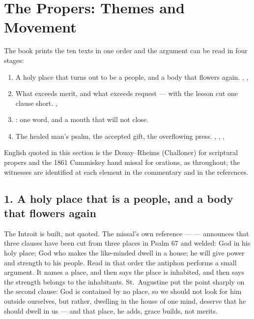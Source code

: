 \sectionguard
\section*{The Propers: Themes and Movement}
\label{triptych:brief-synthesis:start}


The book prints the ten texts in one order and the argument can be read in
four stages:

\begin{enumerate}[leftmargin=1.5em, itemsep=0.1em]
  \item A holy place that turns out to be a people, and a body that flowers again. , , 
  \item What exceeds merit, and what exceeds request --- with the lesson cut one clause short. , 
  \item {}: one word, and a mouth that will not close. 
  \item The healed man's psalm, the accepted gift, the overflowing press. , , , 
\end{enumerate}

English quoted in this section is the Douay--Rheims (Challoner) for scriptural
propers and the 1861 Cummiskey hand missal for orations, as throughout; the
witnesses are identified at each element in the commentary and in the
references.

\subsection*{1. A holy place that is a people, and a body that flowers again}

The Introit is built, not quoted. The missal's own reference ---  --- announces that three clauses have been cut from three places in Psalm
67 and welded: God in his holy place; God who makes the like-minded dwell in a
house; he will give power and strength to his people. Read in that order the
antiphon performs a small argument. It names a place, and then says the place
is inhabited, and then says the strength belongs to the inhabitants. St.\
Augustine put the point sharply on the second clause: God is contained by no
place, so we should not look for him outside ourselves, but rather, dwelling
in the house of one mind, deserve that he should dwell in us --- and that
place, he adds, grace builds, not merits.

